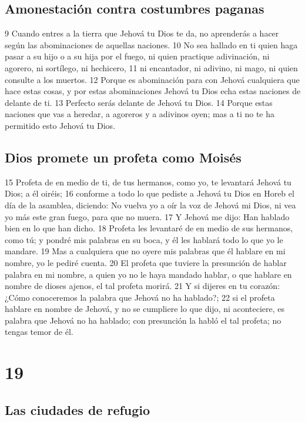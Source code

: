 \section{Amonestación contra costumbres paganas}

9 Cuando entres a la tierra que Jehová tu Dios te da, no aprenderás a hacer según las abominaciones de aquellas naciones.
10 No sea hallado en ti quien haga pasar a su hijo o a su hija por el fuego, ni quien practique adivinación, ni agorero, ni sortílego, ni hechicero,
11 ni encantador, ni adivino, ni mago, ni quien consulte a los muertos.
12 Porque es abominación para con Jehová cualquiera que hace estas cosas, y por estas abominaciones Jehová tu Dios echa estas naciones de delante de ti.
13 Perfecto serás delante de Jehová tu Dios. 
14 Porque estas naciones que vas a heredar, a agoreros y a adivinos oyen; mas a ti no te ha permitido esto Jehová tu Dios.

\section{Dios promete un profeta como Moisés}

15 Profeta de en medio de ti, de tus hermanos, como yo, te levantará Jehová tu Dios; a él oiréis;
16 conforme a todo lo que pediste a Jehová tu Dios en Horeb el día de la asamblea, diciendo: No vuelva yo a oír la voz de Jehová mi Dios, ni vea yo más este gran fuego, para que no muera.
17 Y Jehová me dijo: Han hablado bien en lo que han dicho.
18 Profeta les levantaré de en medio de sus hermanos, como tú; y pondré mis palabras en su boca, y él les hablará todo lo que yo le mandare.
19 Mas a cualquiera que no oyere mis palabras que él hablare en mi nombre, yo le pediré cuenta. 
20 El profeta que tuviere la presunción de hablar palabra en mi nombre, a quien yo no le haya mandado hablar, o que hablare en nombre de dioses ajenos, el tal profeta morirá.
21 Y si dijeres en tu corazón: ¿Cómo conoceremos la palabra que Jehová no ha hablado?;
22 si el profeta hablare en nombre de Jehová, y no se cumpliere lo que dijo, ni aconteciere, es palabra que Jehová no ha hablado; con presunción la habló el tal profeta; no tengas temor de él.

\chapter{19}

\section{Las ciudades de refugio}

